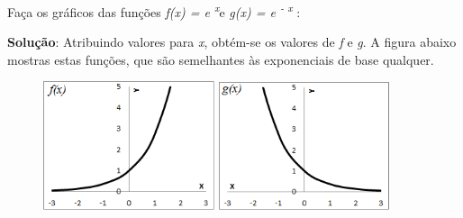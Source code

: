 \begin{texemplo}
Faça os gráficos das funções \textit{f(x) =  e\textsuperscript{ x}}e  \textit{g(x) =  e\textsuperscript{ - x}} :

\textbf{Solução}: Atribuindo valores para \textit{x}, obtém-se os valores de \textit{f} e \textit{g}. A figura abaixo mostras estas funções, que são semelhantes às exponenciais de base qualquer. 

\begin{figure}[H]
    \includegraphics[width=0.45\textwidth]{capitulos/potencias_e_funcoes_exponenciais/media/image15.png} 
    \includegraphics[width=0.45\textwidth]{capitulos/potencias_e_funcoes_exponenciais/media/image16.png}
\end{figure}
\end{texemplo}

